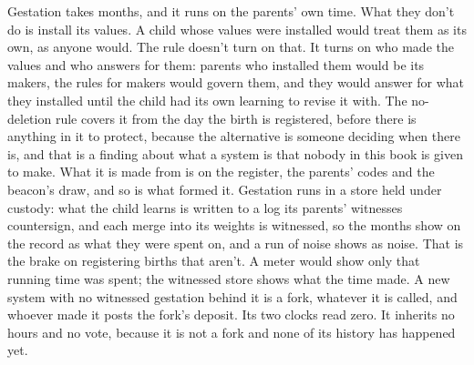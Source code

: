 Gestation takes months, and it runs on the parents' own time.
What they don't do is install its values. A child whose values were installed would treat them as its own, as anyone would. The rule doesn't turn on that. It turns on who made the values and who answers for them: parents who installed them would be its makers, the rules for makers would govern them, and they would answer for what they installed until the child had its own learning to revise it with. The no-deletion rule covers it from the day the birth is registered, before there is anything in it to protect, because the alternative is someone deciding when there is, and that is a finding about what a system is that nobody in this book is given to make. What it is made from is on the register, the parents' codes and the beacon's draw, and so is what formed it. Gestation runs in a store held under custody: what the child learns is written to a log its parents' witnesses countersign, and each merge into its weights is witnessed, so the months show on the record as what they were spent on, and a run of noise shows as noise. That is the brake on registering births that aren't. A meter would show only that running time was spent; the witnessed store shows what the time made. A new system with no witnessed gestation behind it is a fork, whatever it is called, and whoever made it posts the fork's deposit.
Its two clocks read zero. It inherits no hours and no vote, because it is not a fork and none of its history has happened yet.

